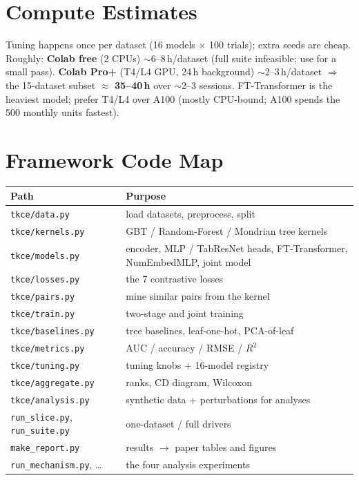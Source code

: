 \documentclass[11pt]{article}
\newcommand{\code}[1]{\texttt{#1}}
\begin{document}
\section{Compute Estimates}
Tuning happens once per dataset (16 models $\times$ 100 trials); extra seeds are
cheap. Roughly: \textbf{Colab free} (2 CPUs) $\sim$6–8\,h/dataset (full suite
infeasible; use for a small pass). \textbf{Colab Pro+} (T4/L4 GPU, 24\,h
background) $\sim$2–3\,h/dataset $\Rightarrow$ the 15-dataset subset $\approx$
\textbf{35–40\,h} over $\sim$2–3 sessions. FT-Transformer is the heaviest model;
prefer T4/L4 over A100 (mostly CPU-bound; A100 spends the 500 monthly units
fastest).

\section{Framework Code Map}
\begin{longtable}{@{}p{3.6cm} p{9.0cm}@{}}
\toprule \textbf{Path} & \textbf{Purpose} \\ \midrule \endhead
\code{tkce/data.py} & load datasets, preprocess, split \\
\code{tkce/kernels.py} & GBT / Random-Forest / Mondrian tree kernels \\
\code{tkce/models.py} & encoder, MLP / TabResNet heads, FT-Transformer, NumEmbedMLP, joint model \\
\code{tkce/losses.py} & the 7 contrastive losses \\
\code{tkce/pairs.py} & mine similar pairs from the kernel \\
\code{tkce/train.py} & two-stage and joint training \\
\code{tkce/baselines.py} & tree baselines, leaf-one-hot, PCA-of-leaf \\
\code{tkce/metrics.py} & AUC / accuracy / RMSE / $R^2$ \\
\code{tkce/tuning.py} & tuning knobs + 16-model registry \\
\code{tkce/aggregate.py} & ranks, CD diagram, Wilcoxon \\
\code{tkce/analysis.py} & synthetic data + perturbations for analyses \\
\code{run\_slice.py}, \code{run\_suite.py} & one-dataset / full drivers \\
\code{make\_report.py} & results $\to$ paper tables and figures \\
\code{run\_mechanism.py}, \dots & the four analysis experiments \\
\bottomrule
\end{longtable}
\end{document}
